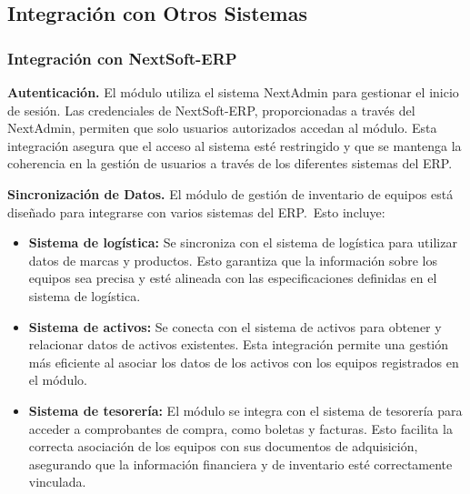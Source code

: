 \documentclass[stu, 12pt, letterpaper, donotrepeattitle, floatsintext, natbib]{apa7}
\begin{document}
\subsection{Integración con Otros Sistemas}
\subsubsection{Integración con NextSoft-ERP}
\textbf{Autenticación. }El módulo utiliza el sistema NextAdmin para gestionar el inicio de sesión. Las credenciales de NextSoft-ERP,
proporcionadas a través del NextAdmin, permiten que solo usuarios autorizados accedan al módulo. Esta integración asegura que el acceso al
sistema esté restringido y que se mantenga la coherencia en la gestión de usuarios a través de los diferentes sistemas del ERP.

\textbf{Sincronización de Datos. }El módulo de gestión de inventario de equipos está diseñado para integrarse con varios sistemas del ERP.~Esto
incluye:
\begin{itemize}
    \item\textbf{Sistema de logística: }Se sincroniza con el sistema de logística para utilizar datos de marcas y productos. Esto garantiza
          que la información sobre los equipos sea precisa y esté alineada con las especificaciones definidas en el sistema de logística.
    \item\textbf{Sistema de activos: }Se conecta con el sistema de activos para obtener y relacionar datos de activos existentes. Esta
          integración permite una gestión más eficiente al asociar los datos de los activos con los equipos registrados en el módulo.
    \item\textbf{Sistema de tesorería: }El módulo se integra con el sistema de tesorería para acceder a comprobantes de compra, como boletas y
          facturas. Esto facilita la correcta asociación de los equipos con sus documentos de adquisición, asegurando que la información
          financiera y de inventario esté correctamente vinculada.
\end{itemize}
\end{document}
